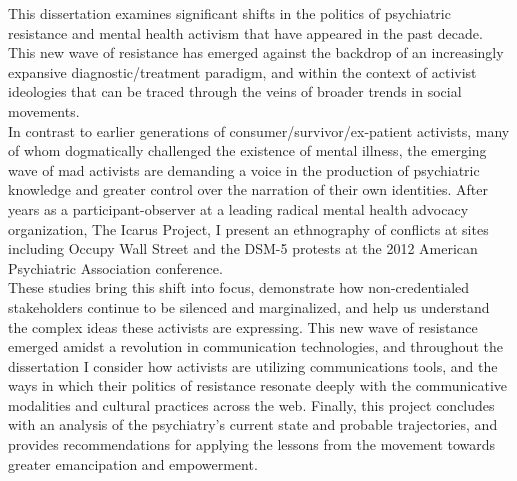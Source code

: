 %


\hfill
\vfill

\begingroup
	\noindent
\endgroup 

\bigskip
\bigskip

\noindent
This dissertation examines significant shifts in the politics of psychiatric resistance and mental health activism that have appeared in the past decade. This new wave of resistance has emerged against the backdrop of an increasingly expansive diagnostic/treatment paradigm, and within the context of activist ideologies that can be traced through the veins of broader trends in social movements. \\

\noindent
In contrast to earlier generations of consumer/survivor/ex-patient activists, many of whom dogmatically challenged the existence of mental illness, the emerging wave of mad activists are demanding a voice in the production of psychiatric knowledge and greater control over the narration of their own identities. After years as a participant-observer at a leading radical mental health advocacy organization, The Icarus Project, I present an ethnography of conflicts at sites including Occupy Wall Street and the DSM-5 protests at the 2012 American Psychiatric Association conference. \\

\noindent
These studies bring this shift into focus, demonstrate how non-credentialed stakeholders continue to be silenced and marginalized, and help us understand the complex ideas these activists are expressing. This new wave of resistance emerged amidst a revolution in communication technologies, and throughout the dissertation I consider how activists are utilizing communications tools, and the ways in which their politics of resistance resonate deeply with the communicative modalities and cultural practices across the web. Finally, this project concludes with an analysis of the psychiatry’s current state and probable trajectories, and provides recommendations for applying the lessons from the movement towards greater emancipation and empowerment. \\


